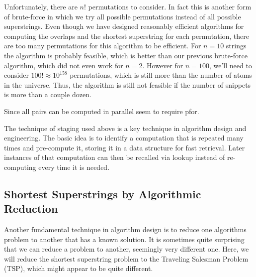 \begin{cluster}
\begin{gram}
Unfortunately, there are $n!$ permutations to consider.
In fact this is another form of brute-force in which we try all
possible permutations instead of all possible superstrings.
Even though we have designed reasonably efficient algorithms for
computing the overlaps and the shortest superstring for each
permutation, there are too many permutations for this algorithm to be
efficient.
For $n = 10$ strings the algorithm is probably feasible, which is
better than our previous brute-force algorithm, which did not even
work for $n = 2$.
However for $n = 100$, we'll need to consider
$100!  \approx 10^{158}$ permutations, which is still more than the
number of atoms in the universe. 
Thus, the algorithm is still not feasible if the number of snippets is
more than a couple dozen.

\end{gram}
\end{cluster}

\begin{cluster}
\label{grp:tch:genome::pairs}

\begin{teachnote}
\label{tch:genome::pairs}
Since all pairs can be computed in parallel seem to require pfor.

\end{teachnote}
\end{cluster}

\begin{cluster}
\label{grp:rmrk:genome::technique}

\begin{remark}
\label{rmrk:genome::technique}
The technique of staging used above is a key technique in algorithm
design and engineering.
The basic idea is to identify a computation that is repeated many
times and pre-compute it, storing it in a data structure for fast
retrieval.
Later instances of that computation can then be recalled via lookup
instead of re-computing every time it is needed. 

\end{remark}
\end{cluster}


\subsection{Shortest Superstrings by Algorithmic Reduction}
\label{sec:genome::alg::reduction-tsp}

\begin{cluster}
\label{grp:grm:genome::fundamental}

\begin{gram}
\label{grm:genome::fundamental}
Another fundamental technique in algorithm design is to reduce one
algorithms problem to another that has a known solution.
It is sometimes quite surprising that we can reduce a problem to
another, seemingly very different one.
Here, we will reduce the shortest superstring problem to the Traveling
Salesman Problem  (TSP), which might appear to be quite different.

\end{gram}
\end{cluster}


